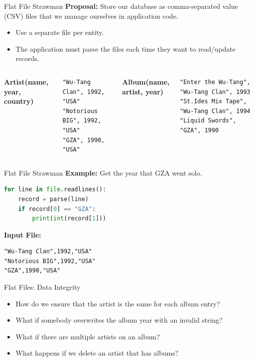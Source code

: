 \begin{frame}[fragile]{Flat File Strawman}
    \textbf{Proposal:} Store our database as comma-separated value (CSV) files that we manage ourselves in application code.
    \begin{itemize}
        \item Use a separate file per entity.
        \item The application must parse the files each time they want to read/update records.
    \end{itemize}
    \vspace{0.5em}
    \begin{columns}
        \textbf{Artist(name, year, country)}
\begin{verbatim}
"Wu-Tang Clan", 1992, "USA"
"Notorious BIG", 1992, "USA"
"GZA", 1990, "USA"
\end{verbatim}
        \textbf{Album(name, artist, year)}
\begin{verbatim}
"Enter the Wu-Tang", "Wu-Tang Clan", 1993
"St.Ides Mix Tape", "Wu-Tang Clan", 1994
"Liquid Swords", "GZA", 1990
\end{verbatim}
    \end{columns}
\end{frame}

\begin{frame}[fragile]{Flat File Strawman}
    \textbf{Example:} Get the year that GZA went solo.
\begin{lstlisting}[language=Python]
for line in file.readlines():
    record = parse(line)
    if record[0] == "GZA":
        print(int(record[1]))
\end{lstlisting}

    \vspace{1em}
    \textbf{Input File:}
\begin{verbatim}
"Wu-Tang Clan",1992,"USA"
"Notorious BIG",1992,"USA"
"GZA",1990,"USA"
\end{verbatim}
\end{frame}

\begin{frame}{Flat Files: Data Integrity}
    \begin{itemize}
        \item How do we ensure that the artist is the same for each album entry?
        \item What if somebody overwrites the album year with an invalid string?
        \item What if there are multiple artists on an album?
        \item What happens if we delete an artist that has albums?
    \end{itemize}
\end{frame}

